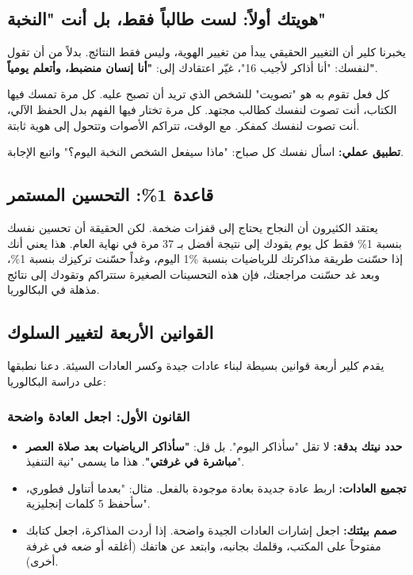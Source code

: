 \documentclass[12pt,a4paper]{book}
\begin{document}
	\subsection{هويتك أولاً: لست طالباً فقط، بل أنت "النخبة"}
	يخبرنا كلير أن التغيير الحقيقي يبدأ من تغيير الهوية، وليس فقط النتائج. بدلاً من أن تقول لنفسك: "أنا أذاكر لأجيب 16"، غيّر اعتقادك إلى: \textbf{"أنا إنسان منضبط، وأتعلم يومياً"}.
	
	
	كل فعل تقوم به هو "تصويت" للشخص الذي تريد أن تصبح عليه. كل مرة تمسك فيها الكتاب، أنت تصوت لنفسك كطالب مجتهد. كل مرة تختار فيها الفهم بدل الحفظ الآلي، أنت تصوت لنفسك كمفكر. مع الوقت، تتراكم الأصوات وتتحول إلى هوية ثابتة.
	
	\begin{important}
		\textbf{تطبيق عملي:} اسأل نفسك كل صباح: "ماذا سيفعل الشخص النخبة اليوم؟" واتبع الإجابة.
	\end{important}
	
	\subsection{قاعدة 1\%: التحسين المستمر}
		\label{sec:ta7sin}
	يعتقد الكثيرون أن النجاح يحتاج إلى قفزات ضخمة. لكن الحقيقة أن تحسين نفسك بنسبة 1\% فقط كل يوم يقودك إلى نتيجة أفضل بـ 37 مرة في نهاية العام. هذا يعني أنك إذا حسّنت طريقة مذاكرتك للرياضيات بنسبة \%1 اليوم، وغداً حسّنت تركيزك بنسبة 1\%، وبعد غد حسّنت مراجعتك، فإن هذه التحسينات الصغيرة ستتراكم وتقودك إلى نتائج مذهلة في البكالوريا.
	
	
	\subsection{القوانين الأربعة لتغيير السلوك}
	\label{sec:four-laws-behavior}
	يقدم كلير أربعة قوانين بسيطة لبناء عادات جيدة وكسر العادات السيئة. دعنا نطبقها على دراسة البكالوريا:
	
	\subsubsection{القانون الأول: اجعل العادة واضحة }
	\begin{itemize}
		\item \textbf{حدد نيتك بدقة:} لا تقل "سأذاكر اليوم". بل قل: \textbf{"سأذاكر الرياضيات بعد صلاة العصر مباشرة في غرفتي"}. هذا ما يسمى "نية التنفيذ".
		\item \textbf{تجميع العادات:} اربط عادة جديدة بعادة موجودة بالفعل. مثال: "بعدما أتناول فطوري، سأحفظ 5 كلمات إنجليزية".
		\item \textbf{صمم بيئتك:} اجعل إشارات العادات الجيدة واضحة. إذا أردت المذاكرة، اجعل كتابك مفتوحاً على المكتب، وقلمك بجانبه، وابتعد عن هاتفك (أغلقه أو ضعه في غرفة أخرى).
	\end{itemize}
	
\end{document}
